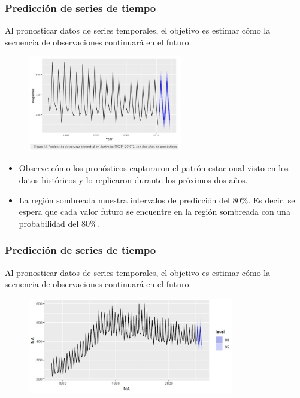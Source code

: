\documentclass[10pt]{beamer}
\begin{document}
\begin{frame}
\frametitle{Predicción de series de tiempo}

Al pronosticar datos de series temporales, el objetivo es estimar cómo la secuencia de observaciones continuará en el futuro.


\begin{figure}
\begin{center}
    \includegraphics[width=0.6\textwidth]{Imagen7.JPG}
\end{center}
\end{figure}

\begin{itemize}
\scriptsize
\item Observe cómo los pronósticos capturaron el patrón estacional visto en los datos históricos y lo replicaron durante los próximos dos años. 

\item La región sombreada muestra intervalos de predicción del 80\%. Es decir, se espera que cada valor futuro se encuentre en la región sombreada con una probabilidad del 80\%.
\end{itemize}


\end{frame}






\begin{frame}
\frametitle{Predicción de series de tiempo}

Al pronosticar datos de series temporales, el objetivo es estimar cómo la secuencia de observaciones continuará en el futuro.

\vspace{4mm}

\begin{figure}
\begin{center}
    \includegraphics[width=0.8\textwidth]{Imagen8.JPG}
\end{center}
\end{figure}



\end{frame}
\end{document}
